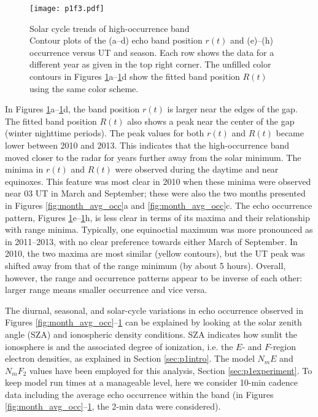 \begin{figure}
	\centering
	\texttt{[image: p1f3.pdf]}
	\caption[Solar cycle trends of high-occurrence band]{{\:}Solar cycle trends of high-occurrence band\\ Contour plots of the (a--d) echo band position \(r(t)\) and (e)--(h) occurrence versus UT and season. Each row shows the data for a different year as given in the top right corner.  The unfilled color contours in Figures \ref{fig:year_color}a--\ref{fig:year_color}d show the fitted band position \(R(t)\) using the same color scheme.}
	\label{fig:year_color}
\end{figure}

In Figures \ref{fig:year_color}a--\ref{fig:year_color}d, the band position \(r\left(t\right)\) is larger near the edges of the gap.  The fitted band position \(R(t)\) also shows a peak near the center of the gap (winter nighttime periods).  The peak values for both \(r(t)\) and \(R(t)\) became lower between 2010 and 2013.  This indicates that the high-occurrence band moved closer to the radar for years further away from the solar minimum.  The minima in \(r(t)\) and \(R\left(t\right)\) were observed during the daytime and near equinoxes. This feature was most clear in 2010 when these minima were observed near 03 UT in March and September; these were also the two months presented in Figures \ref{fig:month_avg_occ}a and \ref{fig:month_avg_occ}c. The echo occurrence pattern, Figures \ref{fig:year_color}e--\ref{fig:year_color}h, is less clear in terms of its maxima and their relationship with range minima. Typically, one equinoctial maximum was more pronounced as in 2011--2013, with no clear preference towards either March of September. In 2010, the two maxima are most similar (yellow contours), but the UT peak was shifted away from that of the range minimum (by about 5 hours). Overall, however, the range and occurrence patterns appear to be inverse of each other: larger range means smaller occurrence and vice versa.

The diurnal, seasonal, and solar-cycle variations in echo occurrence observed in Figures \ref{fig:month_avg_occ}--\ref{fig:year_color} can be explained by looking at the solar zenith angle (SZA) and ionospheric density conditions. SZA indicates how sunlit the ionosphere is and the associated degree of ionization, i.e. the \(E\)- and \(F\)-region electron densities, as explained in Section \ref{sec:p1intro}. The model \(N_mE\) and \(N_mF_2\) values have been employed for this analysis, Section \ref{sec:p1experiment}. To keep model run times at a manageable level, here we consider 10-min cadence data including the average echo occurrence within the band (in Figures \ref{fig:month_avg_occ}--\ref{fig:year_color}, the 2-min data were considered).



